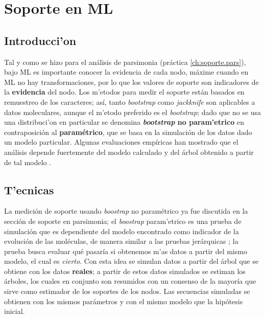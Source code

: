 \chapter{Soporte en ML}
\section*{Introducci'on}
Tal y como se hizo para el an\'alisis de parsimonia (pr\'actica \ref{ch:soporte.pars}), bajo ML es importante conocer la evidencia de cada nodo, m\'axime cuando en ML no hay transformaciones, por lo que los valores de soporte son indicadores de la \textbf{evidencia} del nodo. Los m'etodos para medir el soporte est\'an basados en remuestreo de los caracteres; as\'i, tanto \textit{bootstrap}  como \textit{jackknife}  son aplicables a datos moleculares, aunque el m'etodo preferido es el \textit{bootstrap}; dado que no se usa una distribuci'on en particular se denomina \textbf{\textit{bootstrap} no param'etrico} en contraposici\'on al \textbf{param\'etrico}, que se basa en la simulaci\'on de los datos dado un modelo particular. Algunas evaluaciones emp\'iricas han mostrado que el an\'alisis depende fuertemente del modelo calculado y del \'arbol obtenido a partir de tal modelo \cite{Felsenstein2004} \cite{Antezana2003}.\\

\section{T'ecnicas}
La medici\'on de soporte usando \textit{boostrap} no param\'etrico ya fue discutida en la secci\'on de soporte en parsimonia; el \textit{boostrap} param'etrico es una prueba de simulaci\'on que es dependiente del modelo encontrado como indicador de la evoluci\'on de las mol\'eculas, de manera similar a las pruebas jer\'arquicas \cite{Felsenstein2004}; la prueba busca evaluar qu\'e pasar\'ia si obtenemos m'as datos a partir del mismo modelo, el cual es \textit{cierto}. Con esta idea se simulan datos a partir del \'arbol que se obtiene con los datos \textbf{reales}; a partir de estos datos simulados se estiman los \'arboles, los cuales en conjunto son resumidos con un consenso de la mayor\'ia que sirve como estimador de los soportes de los nodos. Las secuencias simuladas se obtienen con los mismos par\'ametros y con el mismo modelo que la hip\'otesis inicial.




